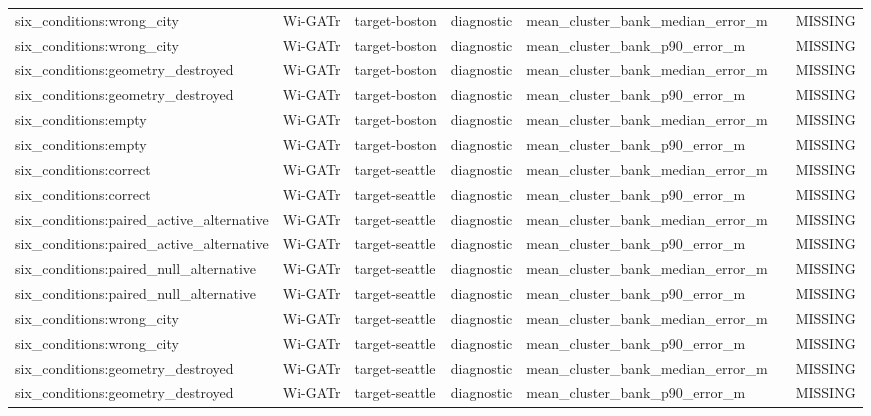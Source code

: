 \begin{longtable}{lllllll}
six\_conditions:wrong\_city & Wi-GATr & target-boston & diagnostic & mean\_cluster\_bank\_median\_error\_m &  & MISSING \\
six\_conditions:wrong\_city & Wi-GATr & target-boston & diagnostic & mean\_cluster\_bank\_p90\_error\_m &  & MISSING \\
six\_conditions:geometry\_destroyed & Wi-GATr & target-boston & diagnostic & mean\_cluster\_bank\_median\_error\_m &  & MISSING \\
six\_conditions:geometry\_destroyed & Wi-GATr & target-boston & diagnostic & mean\_cluster\_bank\_p90\_error\_m &  & MISSING \\
six\_conditions:empty & Wi-GATr & target-boston & diagnostic & mean\_cluster\_bank\_median\_error\_m &  & MISSING \\
six\_conditions:empty & Wi-GATr & target-boston & diagnostic & mean\_cluster\_bank\_p90\_error\_m &  & MISSING \\
six\_conditions:correct & Wi-GATr & target-seattle & diagnostic & mean\_cluster\_bank\_median\_error\_m &  & MISSING \\
six\_conditions:correct & Wi-GATr & target-seattle & diagnostic & mean\_cluster\_bank\_p90\_error\_m &  & MISSING \\
six\_conditions:paired\_active\_alternative & Wi-GATr & target-seattle & diagnostic & mean\_cluster\_bank\_median\_error\_m &  & MISSING \\
six\_conditions:paired\_active\_alternative & Wi-GATr & target-seattle & diagnostic & mean\_cluster\_bank\_p90\_error\_m &  & MISSING \\
six\_conditions:paired\_null\_alternative & Wi-GATr & target-seattle & diagnostic & mean\_cluster\_bank\_median\_error\_m &  & MISSING \\
six\_conditions:paired\_null\_alternative & Wi-GATr & target-seattle & diagnostic & mean\_cluster\_bank\_p90\_error\_m &  & MISSING \\
six\_conditions:wrong\_city & Wi-GATr & target-seattle & diagnostic & mean\_cluster\_bank\_median\_error\_m &  & MISSING \\
six\_conditions:wrong\_city & Wi-GATr & target-seattle & diagnostic & mean\_cluster\_bank\_p90\_error\_m &  & MISSING \\
six\_conditions:geometry\_destroyed & Wi-GATr & target-seattle & diagnostic & mean\_cluster\_bank\_median\_error\_m &  & MISSING \\
six\_conditions:geometry\_destroyed & Wi-GATr & target-seattle & diagnostic & mean\_cluster\_bank\_p90\_error\_m &  & MISSING \\

\end{longtable}
